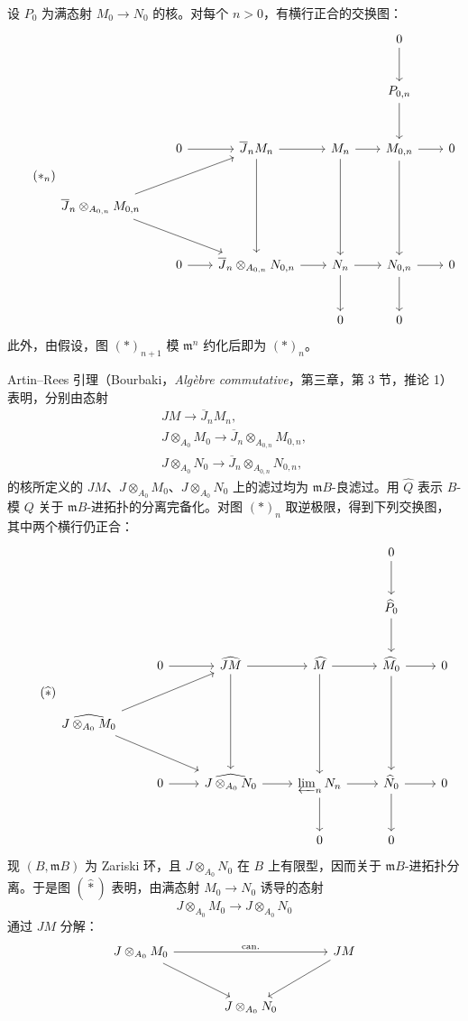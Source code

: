 设 \(P_0\) 为满态射 \(M_0\to N_0\) 的核。对每个 \(n>0\)，有横行正合的交换图：
\[
\tag{$\ast_n$}\label{sga3:xv:lemma:2-8:equation:ast-n}
\begin{tikzcd}[column sep=2em,row sep=large]
&&&& 0 \arrow[d] & \\
&&&& P_{0,n} \arrow[d] & \\
& 0 \arrow[r]
  & \overline{J}_nM_n \arrow[r] \arrow[dd]
  & M_n \arrow[r] \arrow[dd]
  & M_{0,n} \arrow[r] \arrow[dd] & 0 \\
\overline{J}_n\otimes_{A_{0,n}}M_{0,n}
      \arrow[urr] \arrow[drr] &&&&& \\
& 0 \arrow[r]
  & \overline{J}_n\otimes_{A_{0,n}}N_{0,n} \arrow[r]
  & N_n \arrow[r] \arrow[d]
  & N_{0,n} \arrow[r] \arrow[d] & 0 \\
&&& 0 & 0 &
\end{tikzcd}
\]
此外，由假设，图 \((\ast)_{n+1}\) 模 \(\mathfrak m^n\) 约化后即为 \((\ast)_n\)。

Artin--Rees 引理（Bourbaki，\emph{Algèbre commutative}，第三章，第 3 节，推论 1）表明，分别由态射
\[
\begin{gathered}
  JM\longrightarrow \overline{J}_nM_n,\\
  J\otimes_{A_0}M_0
    \longrightarrow \overline{J}_n\otimes_{A_{0,n}}M_{0,n},\\
  J\otimes_{A_0}N_0
    \longrightarrow \overline{J}_n\otimes_{A_{0,n}}N_{0,n},
\end{gathered}
\]
的核所定义的 \(JM\)、\(J\otimes_{A_0}M_0\)、\(J\otimes_{A_0}N_0\) 上的滤过均为 \(\mathfrak mB\)-良滤过。用 \(\widehat Q\) 表示 \(B\)-模 \(Q\) 关于 \(\mathfrak mB\)-进拓扑的分离完备化。对图 \((\ast)_n\) 取逆极限，得到下列交换图，其中两个横行仍正合：
\[
\tag{$\widehat\ast$}\label{sga3:xv:lemma:2-8:equation:widehat-ast}
\begin{tikzcd}[column sep=normal,row sep=large]
&&&& 0 \arrow[d] & \\
&&&& \widehat P_0 \arrow[d] & \\
& 0 \arrow[r]
  & \widehat{JM} \arrow[r] \arrow[dd]
  & \widehat M \arrow[r] \arrow[dd]
  & \widehat M_0 \arrow[r] \arrow[dd] & 0 \\
\widehat{J\otimes_{A_0}M_0}
      \arrow[urr] \arrow[drr] &&&&& \\
& 0 \arrow[r]
  & \widehat{J\otimes_{A_0}N_0} \arrow[r]
  & \varprojlim_n N_n \arrow[r] \arrow[d]
  & \widehat N_0 \arrow[r] \arrow[d] & 0 \\
&&& 0 & 0 &
\end{tikzcd}
\]
现 \((B,\mathfrak mB)\) 为 Zariski 环，且 \(J\otimes_{A_0}N_0\) 在 \(B\) 上有限型，因而关于 \(\mathfrak mB\)-进拓扑分离。于是图 \((\widehat\ast)\) 表明，由满态射 \(M_0\to N_0\) 诱导的态射
\[
  J\otimes_{A_0}M_0\longrightarrow J\otimes_{A_0}N_0
\]
通过 \(JM\) 分解：
\[
\begin{tikzcd}[column sep=large,row sep=large]
J\otimes_{A_0}M_0 \arrow[rr,"\mathrm{can.}"] \arrow[dr]
  && JM \arrow[dl] \\
& J\otimes_{A_0}N_0 &
\end{tikzcd}
\]


